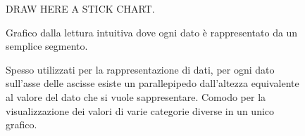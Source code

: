 \documentclass{article}
\begin{document}
\begin{figure}[h]
    \begin{minipage}{0.35\textwidth} %
      DRAW HERE A STICK CHART. 
    \end{minipage}
    \hfill
    \begin{minipage}{0.6\textwidth} %
      Grafico dalla lettura intuitiva dove ogni dato è rappresentato da un semplice segmento.
    \end{minipage}
\end{figure}
\begin{figure}[h]
    \begin{minipage}{0.35\textwidth} %
    \end{minipage}
    \hfill
    \begin{minipage}{0.6\textwidth} %
      Spesso utilizzati per la rappresentazione di dati, per ogni dato sull'asse delle ascisse esiste un parallepipedo dall'altezza equivalente al valore del dato che si vuole sappresentare. Comodo per la visualizzazione dei valori di varie categorie diverse in un unico grafico.
    \end{minipage}
\end{figure}
\end{document}

